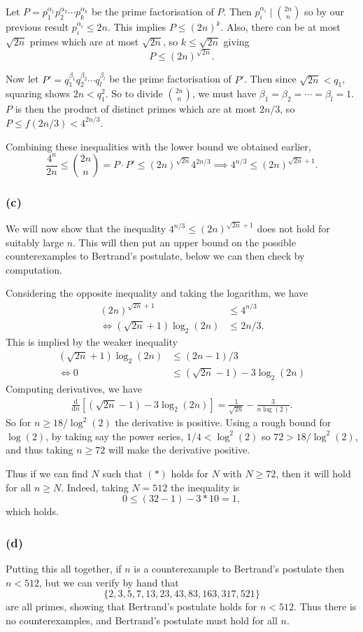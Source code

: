 \documentclass[11pt, a4paper, reqno]{amsart}
\theoremstyle{definition}
\begin{document}
Let $P = p_1^{\alpha_1}p_2^{\alpha_2} \cdots p_k^{\alpha_k}$ be the prime factorisation of $P$.  Then $p_i^{\alpha_i} \mid \binom{2n}{n}$ so by our previous result $p_i^{\alpha_i} \leq 2n$. This implies
$
P \leq (2n)^k.
$
Also, there can be at most $\sqrt{2n}$ primes which are at most $\sqrt{2n}$, so $k \leq \sqrt{2n}$ giving
$$
	P \leq (2n)^{\sqrt{2n}}.
$$

Now let $P' = q_1^{\beta_1} q_2^{\beta_2} \cdots q_l^{\beta_l}$ be the prime factorisation of $P'$. Then since $\sqrt{2n} < q_1$, squaring shows $2n < q_1^2$. So to divide $\binom{2n}{n}$, we must have $\beta_1 = \beta_2 = \cdots = \beta_l = 1$.
$P$ is then the product of distinct primes which are at most $2n/3$, so $P \leq f(2n/3) < 4^{2n/3}$.

Combining these inequalities with the lower bound we obtained earlier, 
$$
\frac{4^n}{2n} \leq \binom{2n}{n} = P \cdot P' \leq (2n)^{\sqrt{2n}} 4^{2n/3} \implies 4^{n/3} \leq (2n)^{\sqrt{2n} + 1}.
$$

\subsubsection*{(c)} We will now show that the inequality $4^{n/3} \leq (2n)^{\sqrt{2n} + 1}$ does not hold for suitably large $n$. This will then put an upper bound on the possible counterexamples to Bertrand's postulate, below we can then check by computation.

Considering the opposite inequality and taking the logarithm, we have
\begin{align*}
	(2n)^{\sqrt{2n} + 1} &\leq 4^{n/3} \\
\iff (\sqrt{2n} + 1) \log_2(2n) &\leq 2n/3.
\end{align*}
This is implied by the weaker inequality
\begin{align*}
	(\sqrt{2n} + 1) \log_2(2n) &\leq (2n-1)/3 \\
\iff   0 &\leq (\sqrt{2n}-1)- 3 \log_2(2n)\tag{$*$}
\end{align*}
Computing derivatives, we have
\begin{align*}
	\frac{\mathrm{d}}{\mathrm{d}n}\left[(\sqrt{2n}-1)- 3 \log_2(2n)\right] = \frac{1}{\sqrt{2n}} - \frac{3}{n \log(2)}. \tag{$**$}
\end{align*}
So for $n \geq 18/\log^2(2)$ the derivative is positive. Using a rough bound for $\log(2)$, by taking say the power series, $1/4 < \log^2(2)$ so $72 > 18/\log^2(2)$, and thus taking  $n \geq 72$ will make the derivative positive.

Thus if we can find $N$ such that $(*)$ holds for $N$ with $N \geq 72$, then it will hold for all $n \geq N$. Indeed, taking $N = 512$ the inequality is
$$
0 \leq (32 - 1) - 3 * 10 = 1,
$$
which holds.


\subsubsection*{(d)}
Putting this all together, if $n$ is a counterexample to Bertrand's postulate then $n < 512$, but we can verify by hand that
$$
	\{2, 3, 5, 7, 13, 23, 43, 83, 163, 317, 521\}
$$
are all primes, showing that Bertrand's postulate holds for $n < 512$. Thus there is no counterexamples, and Bertrand's postulate must hold for all $n$.
\end{document}
